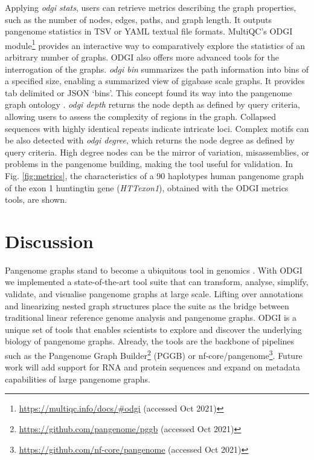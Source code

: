 \documentclass{bioinfo}
\begin{document}
Applying \textit{odgi stats}, users can retrieve metrics describing the graph properties, such as the number of nodes, edges, paths, and graph length. It outputs pangenome statistics in TSV or YAML textual file formats.
MultiQC's \citep{Ewels_2016} ODGI module\footnote{\url{https://multiqc.info/docs/\#odgi} (accessed Oct 2021)} provides an interactive way to comparatively explore the statistics of an arbitrary number of graphs.
ODGI also offers more advanced tools for the interrogation of the graphs. \textit{odgi bin} summarizes the path information into bins of a specified size, enabling a summarized view of gigabase scale graphs. It provides tab delimited or JSON `bins'.
This concept found its way into the pangenome graph ontology \cite{Yokoyama2020}. \textit{odgi depth} returns the node depth as defined by query criteria, allowing users to assess the complexity of regions in the graph.
Collapsed sequences with highly identical repeats indicate intricate loci.
Complex motifs can be also detected with \textit{odgi degree}, which returns the node degree as defined by query criteria.
High degree nodes can be the mirror of variation, misassemblies, or problems in the pangenome building, making the tool useful for validation.
In Fig. \ref{fig:metrics}, the characteristics of a 90 haplotypes human pangenome graph of the exon 1 huntingtin gene \citep{Sathasivam2013,Neueder2017} (\textit{HTTexon1}), obtained with the ODGI metrics tools, are shown.








\section{Discussion}


Pangenome graphs stand to become a ubiquitous tool in genomics \citep{Eizenga_2020}. With ODGI we implemented a state-of-the-art tool suite that can transform, analyse, simplify, validate, and visualise pangenome graphs at large scale.
%
Lifting over annotations and linearizing nested graph structures place the suite as the bridge between traditional linear reference genome analysis and pangenome graphs. ODGI is a unique set of tools that enables scientists to explore and discover the underlying biology of pangenome graphs. Already, the tools are the backbone of pipelines such as the Pangenome Graph Builder\footnote{\url{https://github.com/pangenome/pggb} (accessed Oct 2021)} (PGGB) or nf-core/pangenome\footnote{\url{https://github.com/nf-core/pangenome} (accessed Oct 2021)}. Future work will add support for RNA and protein sequences and expand on metadata capabilities of large pangenome graphs.
\end{document}
